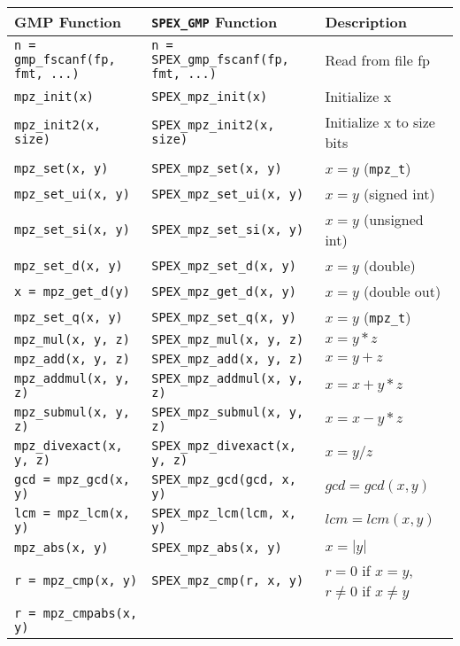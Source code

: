 \documentclass[12pt]{report}
\theoremstyle{definition}
\begin{document}
{\begin{center}
\begin{tabular}{|l|l|l|}
{\bf GMP Function} & \verb|SPEX_GMP| {\bf Function} & {\bf Description} \\
\hline\hline
\verb|n = gmp_fscanf(fp, fmt, ...)|
    & \verb|n = SPEX_gmp_fscanf(fp, fmt, ...)|
    & Read from file fp \\ \hline
\verb|mpz_init(x)|
    & \verb|SPEX_mpz_init(x)|
    & Initialize x \\ \hline
\verb|mpz_init2(x, size)|
    & \verb|SPEX_mpz_init2(x, size)|
    & Initialize x to size bits \\ \hline
\verb|mpz_set(x, y)|
    & \verb|SPEX_mpz_set(x, y)|
    & $x = y$ (\verb|mpz_t|) \\ \hline
\verb|mpz_set_ui(x, y)|
    & \verb|SPEX_mpz_set_ui(x, y)|
    & $x = y$ (signed int) \\ \hline
\verb|mpz_set_si(x, y)|
    & \verb|SPEX_mpz_set_si(x, y)|
    & $x = y$ (unsigned int) \\ \hline
\verb|mpz_set_d(x, y)|
    & \verb|SPEX_mpz_set_d(x, y)|
    & $x = y$ (double)\\ \hline
\verb|x = mpz_get_d(y)|
    & \verb|SPEX_mpz_get_d(x, y)|
    & $x = y$ (double out) \\ \hline
\verb|mpz_set_q(x, y)|
    & \verb|SPEX_mpz_set_q(x, y)|
    & $x = y$ (\verb|mpz_t|) \\ \hline
\verb|mpz_mul(x, y, z)|
    & \verb|SPEX_mpz_mul(x, y, z)|
    & $x = y*z$ \\ \hline
\verb|mpz_add(x, y, z)|
    & \verb|SPEX_mpz_add(x, y, z)|
    & $x = y+z$ \\ \hline
\verb|mpz_addmul(x, y, z)|
    & \verb|SPEX_mpz_addmul(x, y, z)|
    & $x = x+y*z$ \\ \hline
\verb|mpz_submul(x, y, z)|
    & \verb|SPEX_mpz_submul(x, y, z)|
    & $x = x-y*z$ \\ \hline
\verb|mpz_divexact(x, y, z)|
    & \verb|SPEX_mpz_divexact(x, y, z)|
    & $x = y/z$ \\ \hline
\verb|gcd = mpz_gcd(x, y)|
    & \verb|SPEX_mpz_gcd(gcd, x, y)|
    & $gcd = gcd(x,y)$\\ \hline
\verb|lcm = mpz_lcm(x, y)|
    & \verb|SPEX_mpz_lcm(lcm, x, y)|
    & $lcm = lcm(x,y)$ \\ \hline
\verb|mpz_abs(x, y)|
    & \verb|SPEX_mpz_abs(x, y)|
    & $x = |y|$ \\ \hline
\verb|r = mpz_cmp(x, y)|
    & \verb|SPEX_mpz_cmp(r, x, y)|
    & $r = 0$ if $x=y$, $r\neq 0$  if $x\neq y$ \\ \hline
\verb|r = mpz_cmpabs(x, y)|

\end{tabular}
\end{center}}
\end{document}
